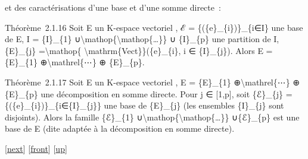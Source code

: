 \documentclass[]{article}
\begin{document}
et des caractérisations d'une base et d'une somme directe~:

Théorème~2.1.16 Soit E un K-espace vectoriel , ℰ =
\{(\{e\}\_\{i\})\}\_\{i∈I\} une base de E, I = \{I\}\_\{1\}
∪\textbackslash{}mathop\{\textbackslash{}mathop\{\ldots{}\}\} ∪
\{I\}\_\{p\} une partition de I, \{E\}\_\{j\} =\textbackslash{}mathop\{
\textbackslash{}mathrm\{Vect\}\}(\{e\}\_\{i\}, i ∈ \{I\}\_\{j\}). Alors
E = \{E\}\_\{1\} ⊕\textbackslash{}mathrel\{⋯\} ⊕ \{E\}\_\{p\}.

Théorème~2.1.17 Soit E un K-espace vectoriel , E = \{E\}\_\{1\}
⊕\textbackslash{}mathrel\{⋯\} ⊕ \{E\}\_\{p\} une décomposition en somme
directe. Pour j ∈ {[}1,p{]}, soit \{ℰ\}\_\{j\} =
\{(\{e\}\_\{i\})\}\_\{i∈\{I\}\_\{j\}\} une base de \{E\}\_\{j\} (les
ensembles \{I\}\_\{j\} sont disjoints). Alors la famille \{ℰ\}\_\{1\}
∪\textbackslash{}mathop\{\textbackslash{}mathop\{\ldots{}\}\}
∪\{ℰ\}\_\{p\} est une base de E (dite adaptée à la décomposition en
somme directe).

{[}\href{coursse8.html}{next}{]} {[}\href{coursse7.html}{front}{]}
{[}\href{coursch3.html\#coursse7.html}{up}{]}
\end{document}
